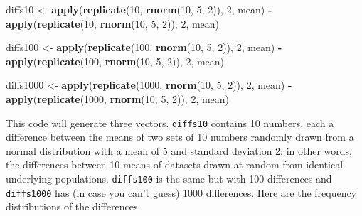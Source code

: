 \documentclass[
]{book}
\newenvironment{Shaded}{\begin{snugshade}}{\end{snugshade}}
\newcommand{\DecValTok}[1]{\textcolor[rgb]{0.00,0.00,0.81}{#1}}
\newcommand{\KeywordTok}[1]{\textcolor[rgb]{0.13,0.29,0.53}{\textbf{#1}}}
\newcommand{\NormalTok}[1]{#1}
\newcommand{\OperatorTok}[1]{\textcolor[rgb]{0.81,0.36,0.00}{\textbf{#1}}}
\newcommand{\StringTok}[1]{\textcolor[rgb]{0.31,0.60,0.02}{#1}}
\begin{document}
\begin{Shaded}
\begin{Highlighting}[]
\NormalTok{diffs10 <-}
\StringTok{  }\KeywordTok{apply}\NormalTok{(}\KeywordTok{replicate}\NormalTok{(}\DecValTok{10}\NormalTok{, }\KeywordTok{rnorm}\NormalTok{(}\DecValTok{10}\NormalTok{, }\DecValTok{5}\NormalTok{, }\DecValTok{2}\NormalTok{)), }\DecValTok{2}\NormalTok{, mean) }\OperatorTok{-}\StringTok{ }\KeywordTok{apply}\NormalTok{(}\KeywordTok{replicate}\NormalTok{(}\DecValTok{10}\NormalTok{, }\KeywordTok{rnorm}\NormalTok{(}\DecValTok{10}\NormalTok{, }\DecValTok{5}\NormalTok{, }\DecValTok{2}\NormalTok{)), }\DecValTok{2}\NormalTok{, mean)}

\NormalTok{diffs100 <-}
\StringTok{  }\KeywordTok{apply}\NormalTok{(}\KeywordTok{replicate}\NormalTok{(}\DecValTok{100}\NormalTok{, }\KeywordTok{rnorm}\NormalTok{(}\DecValTok{10}\NormalTok{, }\DecValTok{5}\NormalTok{, }\DecValTok{2}\NormalTok{)), }\DecValTok{2}\NormalTok{, mean) }\OperatorTok{-}\StringTok{ }\KeywordTok{apply}\NormalTok{(}\KeywordTok{replicate}\NormalTok{(}\DecValTok{100}\NormalTok{, }\KeywordTok{rnorm}\NormalTok{(}\DecValTok{10}\NormalTok{, }\DecValTok{5}\NormalTok{, }\DecValTok{2}\NormalTok{)), }\DecValTok{2}\NormalTok{, mean)}

\NormalTok{diffs1000 <-}
\StringTok{  }\KeywordTok{apply}\NormalTok{(}\KeywordTok{replicate}\NormalTok{(}\DecValTok{1000}\NormalTok{, }\KeywordTok{rnorm}\NormalTok{(}\DecValTok{10}\NormalTok{, }\DecValTok{5}\NormalTok{, }\DecValTok{2}\NormalTok{)), }\DecValTok{2}\NormalTok{, mean) }\OperatorTok{-}\StringTok{ }\KeywordTok{apply}\NormalTok{(}\KeywordTok{replicate}\NormalTok{(}\DecValTok{1000}\NormalTok{, }\KeywordTok{rnorm}\NormalTok{(}\DecValTok{10}\NormalTok{, }\DecValTok{5}\NormalTok{, }\DecValTok{2}\NormalTok{)), }\DecValTok{2}\NormalTok{, mean)}
\end{Highlighting}
\end{Shaded}

This code will generate three vectors. \texttt{diffs10} contains 10 numbers, each a difference between the means of two sets of 10 numbers randomly drawn from a normal distribution with a mean of 5 and standard deviation 2: in other words, the differences between 10 means of datasets drawn at random from identical underlying populations. \texttt{diffs100} is the same but with 100 differences and \texttt{diffs1000} has (in case you can't guess) 1000 differences. Here are the frequency distributions of the differences.
\end{document}
